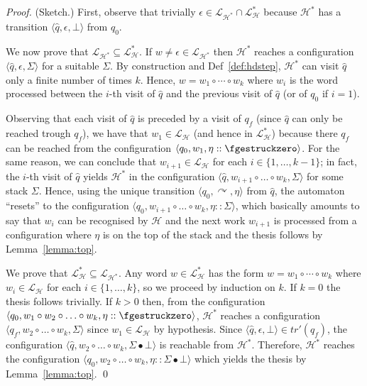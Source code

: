 \documentclass[runningheads,a4paper]{llncs}
\newcommand{\longversion}[1]{#1}
\newcommand{\stk}{\Sigma}
\newcommand{\pushtr}{\curvearrowright}
\newcommand{\stkupd}[2]{{#1} \bullet {#2}}
\newcommand{\estk}{\fgestruckzero}
\newcommand{\trans}{\mathit{tr}}
\newcommand{\emptystr}{\epsilon}
\newcommand{\lang}[1]{\mathcal{L}_{#1}}
\newcommand{\tuple}[1]{\langle#1\rangle}
\newcommand{\hdtr}[3]{\tuple{#2,#1,#3}}
\begin{document}
\longversion{
  \begin{proof}(Sketch.)
First, observe that trivially $\emptystr \in \lang{\mathcal H^\ast}
    \cap \lang{\mathcal H}^\ast$ because $\mathcal H^\ast$ has a
    transition $\hdtr \emptystr {\hat q} \bot$ from $q_0$.

    We now prove that $\lang{\mathcal H^\ast} \subseteq \lang{\mathcal
      H}^\ast$.
If $w \neq \emptystr \in \lang{\mathcal H^\ast}$ then $\mathcal
    H^\ast$ reaches a configuration $\hdtr \emptystr {\hat q} \stk$
    for a suitable $\stk$.
By construction and Def~\ref{def:hdstep}, $\mathcal H^\ast$
    can visit $\hat q$ only a finite number of times $k$.
Hence, $w = w_1 \circ \cdots \circ w_k$ where $w_i$ is the word
    processed between the $i$-th visit of $\hat q$ and the previous visit
    of $\hat q$ (or of $q_0$ if $i=1$).
    
    Observing that each visit of $\hat q$ is preceded by a visit of
    $q_f$ (since $\hat q$ can only be reached trough $q_f$), we have
    that $w_1 \in \lang{\mathcal H}$ (and hence in $\lang{\mathcal
      H}^\ast$) because there $q_f$ can be reached from the configuration
    $\tuple{q_0,w_1,\eta::\estk}$.
For the same reason, we can conclude that $w_{i+1} \in
    \lang{\mathcal H}$ for each $i \in \{1, \ldots, k-1\}$; in fact, the
    $i$-th visit of $\hat q$ yields $\mathcal H^\ast$ in the
    configuration $\tuple{\hat q, w_{i+1} \circ \ldots \circ w_k, \stk}$
    for some stack $\stk$.
Hence, using the unique transition $\hdtr \pushtr {q_0} \eta$ from
    $\hat q$, the automaton ``resets'' to the configuration
    $\tuple{q_0,w_{i+1} \circ \ldots \circ w_k, \eta::\stk}$, which
    basically amounts to say that $w_i$ can be recognised by $\mathcal
    H$ and the next work $w_{i+1}$ is processed from a configuration
    where $\eta$ is on the top of the stack and the thesis follows
    by Lemma~\ref{lemma:top}.

    We prove that $\lang{\mathcal H}^\ast \subseteq \lang{\mathcal
      H^\ast}$.
Any word $w \in \lang{\mathcal H}^\ast$ has the form $w = w_1 \circ
    \cdots \circ w_k$ where $w_i \in \lang{\mathcal H}$ for each $i \in
    \{1, \ldots, k\}$, so we proceed  by induction on $k$.
If $k = 0$ the thesis follows trivially.
If $k > 0$ then, from the configuration $\tuple{q_0, w_1 \circ w_2
      \circ \ldots \circ w_k, \eta::\estk}$, $\mathcal H^\ast$ reaches a
    configuration $\tuple{q_f, w_2 \circ \ldots \circ w_k, \stk}$ since
    $w_1 \in \lang{\mathcal H}$ by hypothesis.
Since $\hdtr \emptystr {\hat q} \bot \in \trans'(q_f)$, the
    configuration $\tuple{\hat q, w_2 \circ \ldots \circ w_k, \stkupd
      \stk \bot}$ is reachable from $\mathcal H^\ast$.
Therefore, $\mathcal H^\ast$ reaches the configuration $\tuple{q_0,
      w_2 \circ \ldots \circ w_k, \eta :: \stkupd \stk \bot}$ which
    yields the thesis by Lemma~\ref{lemma:top}.
\qed
  \end{proof}
}
\end{document}
